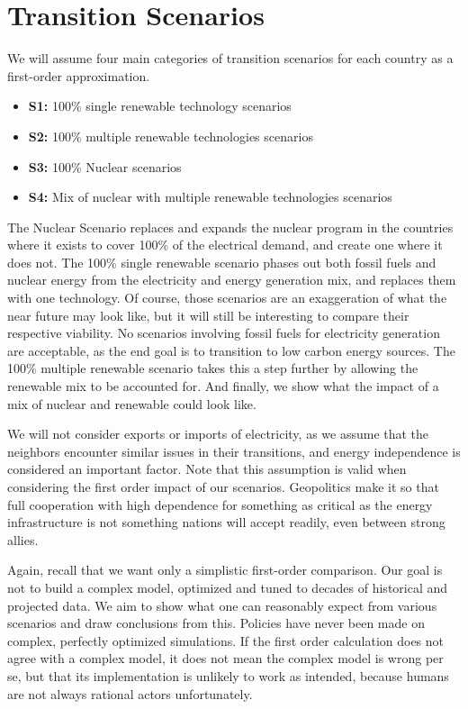 \setchapterpreamble[u]{\margintoc}
\chapter{Transition Scenarios}

We will assume four main categories of transition scenarios for each country as a first-order approximation.

\begin{itemize}
	\item \textbf{S1:} 100\% single renewable technology scenarios
	\item \textbf{S2:} 100\% multiple renewable technologies scenarios
	\item \textbf{S3:} 100\% Nuclear scenarios
	\item \textbf{S4:} Mix of nuclear with multiple renewable technologies scenarios
\end{itemize}

The Nuclear Scenario replaces and expands the nuclear program in the countries where it exists to cover 100\% of the electrical demand, and create one where it does not. The 100\% single renewable scenario phases out both fossil fuels and nuclear energy from the electricity and energy generation mix, and replaces them with one technology. Of course, those scenarios are an exaggeration of what the near future may look like, but it will still be interesting to compare their respective viability. No scenarios involving fossil fuels for electricity generation are acceptable, as the end goal is to transition to low carbon energy sources. The 100\% multiple renewable scenario takes this a step further by allowing the renewable mix to be accounted for. And finally, we show what the impact of a mix of nuclear and renewable could look like.

We will not consider exports or imports of electricity, as we assume that the neighbors encounter similar issues in their transitions, and energy independence is considered an important factor. Note that this assumption is valid when considering the first order impact of our scenarios. Geopolitics make it so that full cooperation with high dependence for something as critical as the energy infrastructure is not something nations will accept readily, even between strong allies.


Again, recall that we want only a simplistic first-order comparison. Our goal is not to build a complex model, optimized and tuned to decades of historical and projected data. We aim to show what one can reasonably expect from various scenarios and draw conclusions from this. Policies have never been made on complex, perfectly optimized simulations. If the first order calculation does not agree with a complex model, it does not mean the complex model is wrong per se, but that its implementation is unlikely to work as intended, because humans are not always rational actors unfortunately.

